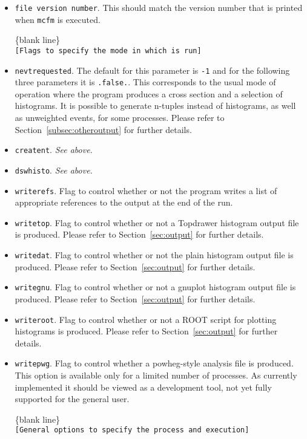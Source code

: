\documentclass{article}
\begin{document}
\begin{itemize}
\item {\tt file version number}. This should match the version number
that is printed when {\tt mcfm} is executed.

\begin{center}
\{blank line\} \\
{\tt [Flags to specify the mode in which \MCFM is run] }
\end{center}

\item {\tt nevtrequested}. The default for this parameter is {\tt -1} and for the following three
parameters it is {\tt .false.}.  This corresponds to the usual mode
of operation where the program produces a cross section and a selection of histograms.
It is possible to generate n-tuples instead of histograms,
as well as unweighted events, for some processes. Please refer to
Section~\ref{subsec:otheroutput} for further details.
\item {\tt creatent}. {\it See above.}
\item {\tt dswhisto}. {\it See above.}
\item {\tt writerefs}. Flag to control whether or not the program writes a list
of appropriate references to the output at the end of the run. 
\item {\tt writetop}. Flag to control whether or not a Topdrawer histogram output file
is produced. Please refer to Section~\ref{sec:output} for further details.
\item {\tt writedat}. Flag to control whether or not the plain histogram output file
is produced. Please refer to Section~\ref{sec:output} for further details.
\item {\tt writegnu}. Flag to control whether or not a gnuplot histogram output file
is produced. Please refer to Section~\ref{sec:output} for further details.
\item {\tt writeroot}. Flag to control whether or not a ROOT script for plotting
histograms is produced. Please refer to Section~\ref{sec:output} for further details.
\item {\tt writepwg}. Flag to control whether a powheg-style analysis file is produced.
This option is available only for a limited number of processes. As currently implemented it
should be viewed as a development tool, not yet fully supported for the general user.

\begin{center}
\{blank line\} \\
{\tt [General options to specify the process and execution] }
\end{center}


\end{itemize}
\end{document}
